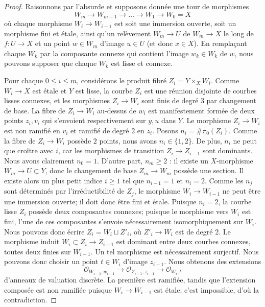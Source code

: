 \begin{proof}
Raisonnons par l'absurde et supposons donnée une tour de morphismes
$$
W_m \to W_{m-1} \to \dots \to W_1 \to W_0 = X
$$
où chaque morphisme $W_i \to W_{i - 1}$ est soit une immersion ouverte, soit un
morphisme fini et \'etale, ainsi qu'un relèvement $W_m \to U$ de $W_m \to X$ le long de
$f : U \to X$ et un point $w \in W_m$ d'image $u \in U$
(et donc $x \in X$). En remplaçant chaque $W_k$ par la composante connexe
qui contient l'image $w_k \in W_k$ de $w$, nous pouvons supposer
que chaque $W_k$ est lisse et connexe.

\medskip\noindent
Pour chaque $0 \le i \le m$, considérons le produit fibré $Z_i = Y \times_X W_i$.
Comme $W_i \to X$ est \'etale et $Y$ est lisse, la courbe $Z_i$ est une réunion
disjointe de courbes lisses connexes, et les morphismes $Z_i \to W_i$ sont finis
de degré $3$ par changement de base. La fibre de $Z_i \to W_i$
au-dessus de $w_i$ est manifestement formée de deux points $z_i, v_i$ qui s'envoient
respectivement sur $y, u$ dans $Y$. Le morphisme $Z_i \to W_i$ est non ramifié en $v_i$
et ramifié de degré $2$ en $z_i$. Posons $n_i = \#\pi_0(Z_i)$. Comme la fibre de
$Z_i \to W_i$ possède $2$ points, nous avons $n_i \in \{1, 2\}$. De plus, $n_i$ ne peut
que croître avec $i$, car les morphismes de transition $Z_i \to Z_{i - 1}$ sont dominants.
Nous avons clairement $n_0 = 1$. D'autre part, $n_m \geq 2$ : il existe un
$X$-morphisme $W_m \to U \subset Y$, donc le changement de base $Z_m \to W_m$
possède une section. Il existe alors un plus petit indice $i \ge 1$ tel que $n_{i - 1} = 1$
et $n_i = 2$. Comme les $n_j$ sont déterminés par l'irréductibilité de $Z_j$,
le morphisme $W_i \to W_{i - 1}$ ne peut être une immersion ouverte;
il doit donc être fini et \'etale. Puisque $n_i = 2$, la courbe lisse $Z_i$
possède deux composantes connexes; puisque le morphisme vers $W_i$ est fini, l'une de
ces composantes s'envoie nécessairement isomorphiquement sur $W_i$.
Nous pouvons donc écrire $Z_i = W_i \sqcup Z'_i$, où $Z'_i \to W_i$ est de degré $2$.
Le morphisme induit $W_i \subset Z_i \to Z_{i - 1}$ est dominant
entre deux courbes connexes, toutes deux finies sur $W_{i - 1}$.
Un tel morphisme est nécessairement surjectif. Nous pouvons donc choisir un point $t \in W_i$
d'image $z_{i - 1}$. Nous obtenons des extensions
$$
\mathcal{O}_{W_{i - 1}, w_{i - 1}} \to
\mathcal{O}_{Z_{i - 1}, z_{i - 1}} \to
\mathcal{O}_{W_i, t}
$$
d'anneaux de valuation discrète. La première est ramifiée, tandis que
l'extension composée est non ramifiée puisque $W_i \to W_{i - 1}$ est \'etale; c'est
impossible, d'où la contradiction.
\end{proof}










